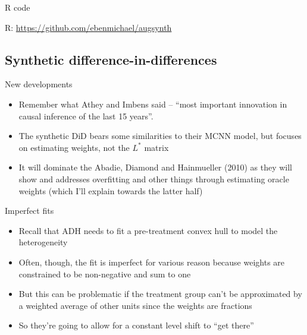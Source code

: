 \documentclass{beamer}
\begin{document}
\begin{frame}{R code}

R: \url{https://github.com/ebenmichael/augsynth}

\end{frame}

\subsection{Synthetic difference-in-differences}

\begin{frame}{New developments}

\begin{itemize}
\item Remember what Athey and Imbens said -- ``most important innovation in causal inference of the last 15 years''.
\item The synthetic DiD bears some similarities to their MCNN model, but focuses on estimating weights, not the $L^*$ matrix
\item It will dominate the Abadie, Diamond and Hainmueller (2010) as they will show and addresses overfitting and other things through estimating oracle weights (which I'll explain towards the latter half)
\end{itemize}

\end{frame}





\begin{frame}{Imperfect fits}

\begin{itemize}
\item Recall that ADH needs to fit a pre-treatment convex hull to model the heterogeneity
\item Often, though, the fit is imperfect for various reason because weights are constrained to be non-negative and sum to one
\item But this can be problematic if the treatment group can't be approximated by a weighted average of other units since the weights are fractions 
\item So they're going to allow for a constant level shift to ``get there''
\end{itemize}

\end{frame}
\end{document}
